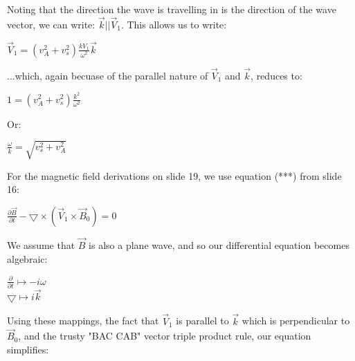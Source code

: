 \vspace{5mm}

Noting that the direction the wave is travelling in is the direction of
the wave vector, we can write: $\vec{k}||\vec{V}_{1}$. This allows us to
write:

\vspace{5mm}

\begin{center}
  $\vec{V}_{1} = (v_{A}^{2}+v_{s}^{2})\frac{kV_{1}}{\omega^{2}}\vec{k}$
\end{center}

\vspace{5mm}

...which, again becuase of the parallel nature of $\vec{V}_{1}$ and
$\vec{k}$, reduces to:

\vspace{5mm}

\begin{center}
  $1 = (v_{A}^{2}+v_{s}^{2})\frac{k^{2}}{\omega^{2}}$
\end{center}
\vspace{5mm}

Or:

\vspace{5mm}
\begin{center}
  $\frac{\omega}{k}=\sqrt{v_{s}^{2}+v_{A}^{2}}$
\end{center}
\vspace{5mm}

For the magnetic field derivations on slide 19, we use equation (***)
from slide 16:
\vspace{5mm}
\begin{center}
  $\frac{\partial \vec{B}}{\partial t} - \bigtriangledown \times (\vec{V}_{1}
  \times \vec{B}_{0}) = 0$
\end{center}
\vspace{5mm}

We assume that $\vec{B}$ is also a plane wave, and so our differential
equation becomes algebraic:

\vspace{5mm}
\begin{center}
  $\frac{\partial}{\partial t} \mapsto -i\omega$ \\
  $\bigtriangledown \mapsto i\vec{k}$
\end{center}
\vspace{5mm}

Using these mappings, the fact that $\vec{V}_{1}$ is parallel to
$\vec{k}$ which is perpendicular to $\vec{B}_{0}$, and the trusty "BAC
CAB" vector triple product rule, our equation
simplifies:

